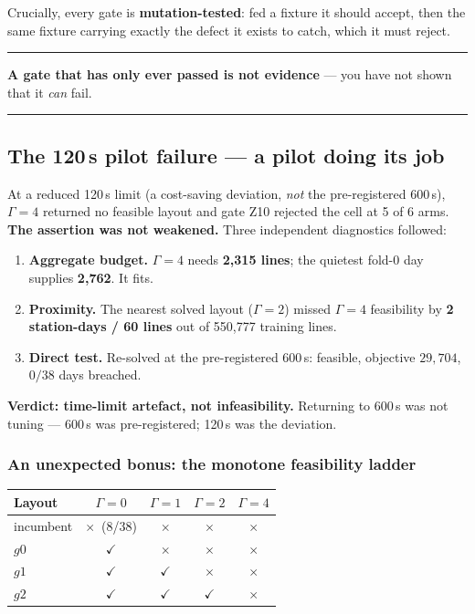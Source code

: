 \documentclass[11pt,a4paper]{article}
\newenvironment{keybox}
  {\par\medskip\noindent\rule{\linewidth}{0.9pt}\par\nobreak\smallskip\ignorespaces}
  {\par\smallskip\nobreak\noindent\rule{\linewidth}{0.9pt}\par\medskip}
\newcommand{\yes}{\ensuremath{\checkmark}}
\newcommand{\no}{\ensuremath{\times}}
\begin{document}
Crucially, every gate is \textbf{mutation-tested}: fed a fixture it should
accept, then the same fixture carrying exactly the defect it exists to catch,
which it must reject.

\begin{keybox}
\textbf{A gate that has only ever passed is not evidence} --- you have not shown
that it \emph{can} fail.
\end{keybox}

\subsection{The 120\,s pilot failure --- a pilot doing its job}

At a reduced 120\,s limit (a cost-saving deviation, \emph{not} the
pre-registered 600\,s), $\Gamma=4$ returned no feasible layout and gate Z10
rejected the cell at 5 of 6 arms. \textbf{The assertion was not weakened.}
Three independent diagnostics followed:

\begin{enumerate}
  \item \textbf{Aggregate budget.} $\Gamma=4$ needs \textbf{2{,}315 lines};
        the quietest fold-0 day supplies \textbf{2{,}762}. It fits.
  \item \textbf{Proximity.} The nearest solved layout ($\Gamma=2$) missed
        $\Gamma=4$ feasibility by \textbf{2 station-days / 60 lines} out of
        550{,}777 training lines.
  \item \textbf{Direct test.} Re-solved at the pre-registered 600\,s: feasible,
        objective $29{,}704$, $0/38$ days breached.
\end{enumerate}

\textbf{Verdict: time-limit artefact, not infeasibility.} Returning to 600\,s
was not tuning --- 600\,s was pre-registered; 120\,s was the deviation.

\subsubsection*{An unexpected bonus: the monotone feasibility ladder}

\begin{center}
\begin{tabular}{lcccc}
\toprule
Layout & $\Gamma=0$ & $\Gamma=1$ & $\Gamma=2$ & $\Gamma=4$ \\
\midrule
incumbent & \no\ (8/38) & \no & \no & \no \\
$g0$      & \yes & \no & \no & \no \\
$g1$      & \yes & \yes & \no & \no \\
$g2$      & \yes & \yes & \yes & \no \\
\bottomrule
\end{tabular}
\end{center}
\end{document}

